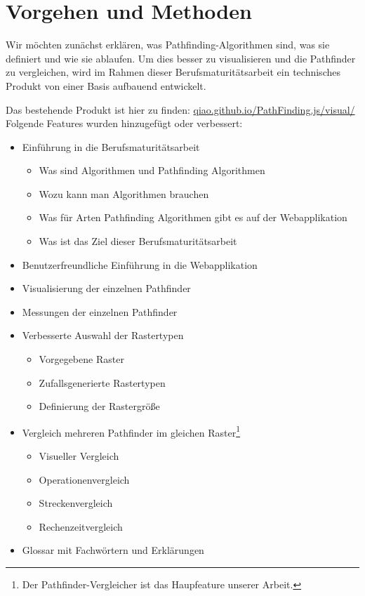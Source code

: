 \section{Vorgehen und Methoden}

Wir möchten zunächst erklären, was Pathfinding-Algorithmen sind, was sie definiert
und wie sie ablaufen. Um dies besser zu visualisieren und die Pathfinder
zu vergleichen, wird im Rahmen dieser Berufsmaturitätsarbeit ein
technisches Produkt von einer Basis aufbauend entwickelt.

Das bestehende Produkt ist hier zu finden: \url{qiao.github.io/PathFinding.js/visual/}\\

Folgende Features wurden hinzugefügt oder verbessert:
\begin{itemize}
\item
  Einführung in die Berufsmaturitätsarbeit
  \begin{itemize}
  \item
    Was sind Algorithmen und Pathfinding Algorithmen
  \item
    Wozu kann man Algorithmen brauchen
  \item
    Was für Arten Pathfinding Algorithmen gibt es auf der Webapplikation
  \item
    Was ist das Ziel dieser Berufsmaturitätsarbeit
  \end{itemize}
\end{itemize}
\begin{itemize}
\item
  Benutzerfreundliche Einführung in die Webapplikation
\item
  Visualisierung der einzelnen Pathfinder
\item
  Messungen der einzelnen Pathfinder
\item
  Verbesserte Auswahl der Rastertypen
  \begin{itemize}
  \item
    Vorgegebene Raster
  \item
    Zufallsgenerierte Rastertypen
  \item
    Definierung der Rastergröße
  \end{itemize}
\item
  Vergleich mehreren Pathfinder im gleichen Raster\footnote{Der Pathfinder-Vergleicher ist das Haupfeature unserer Arbeit.}
  \begin{itemize}
  \item
    Visueller Vergleich
  \item
    Operationenvergleich
  \item
    Streckenvergleich
  \item
    Rechenzeitvergleich
  \end{itemize}
\end{itemize}
\begin{itemize}
\item
  Glossar mit Fachwörtern und Erklärungen
\end{itemize}

